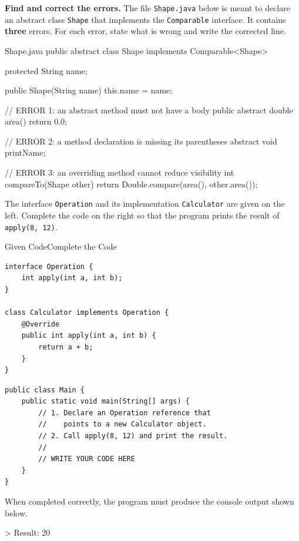 
\textbf{Find and correct the errors.} The file \texttt{Shape.java} below is
meant to declare an abstract class \texttt{Shape} that implements the
\texttt{Comparable} interface. It contains \textbf{three} errors. For each
error, state what is wrong and write the corrected line.

\begin{javafile}{Shape.java}
public abstract class Shape implements Comparable<Shape> {
    protected String name;

    public Shape(String name) {
        this.name = name;
    }

    // ERROR 1: an abstract method must not have a body
    public abstract double area() {
        return 0.0;
    }

    // ERROR 2: a method declaration is missing its parentheses
    abstract void printName;

    // ERROR 3: an overriding method cannot reduce visibility
    int compareTo(Shape other) {
        return Double.compare(area(), other.area());
    }
}
\end{javafile}

The interface \texttt{Operation} and its implementation \texttt{Calculator}
are given on the left. Complete the code on the right so that the program
prints the result of \texttt{apply(8, 12)}.

\begin{splitcode}{Given Code}{Complete the Code}
\begin{lstlisting}
interface Operation {
    int apply(int a, int b);
}

class Calculator implements Operation {
    @Override
    public int apply(int a, int b) {
        return a + b;
    }
}
\end{lstlisting}
\splitdivider
\begin{lstlisting}
public class Main {
    public static void main(String[] args) {
        // 1. Declare an Operation reference that
        //    points to a new Calculator object.
        // 2. Call apply(8, 12) and print the result.
        //
        // WRITE YOUR CODE HERE
    }
}
\end{lstlisting}
\end{splitcode}

\vspace{0.2cm}
\noindent When completed correctly, the program must produce the console
output shown below.

\begin{expectedoutput}
> Result: 20
\end{expectedoutput}

